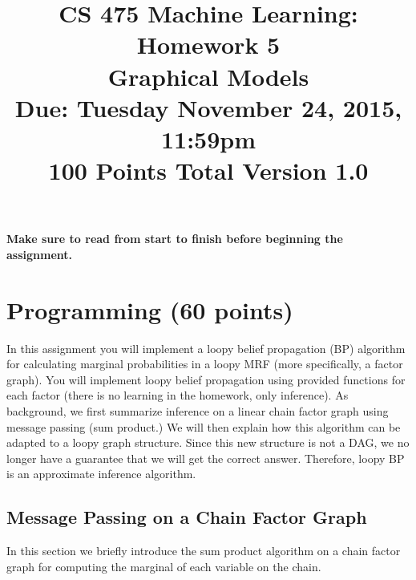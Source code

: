 \documentclass[11pt]{article}
\title{CS 475 Machine Learning: Homework 5\\Graphical Models\\
\Large{Due: Tuesday November 24, 2015, 11:59pm}\\
100 Points Total \hspace{1cm} Version 1.0}
\author{}
\date{}
\begin{document}
\large
\maketitle
\thispagestyle{headings}

\vspace{-.5in}

{\bf Make sure to read from start to finish before beginning the assignment.}
\section{Programming (60 points)}
In this assignment you will implement a loopy belief propagation (BP) algorithm for calculating marginal probabilities in a loopy MRF (more specifically, a factor graph). You will implement loopy belief propagation using provided functions for each factor
(there is no learning in the homework, only inference). As background, we first summarize inference on a linear chain factor graph using message passing (sum product.) We will then explain how this algorithm can be adapted to a loopy graph
structure. Since this new structure is not a DAG, we no longer have a guarantee that we will get the correct answer. Therefore, loopy BP is an approximate inference algorithm. 

\subsection{Message Passing on a Chain Factor Graph}
In this section we briefly introduce the sum product algorithm on a chain factor graph for computing the marginal of each variable on the chain.
\end{document}

